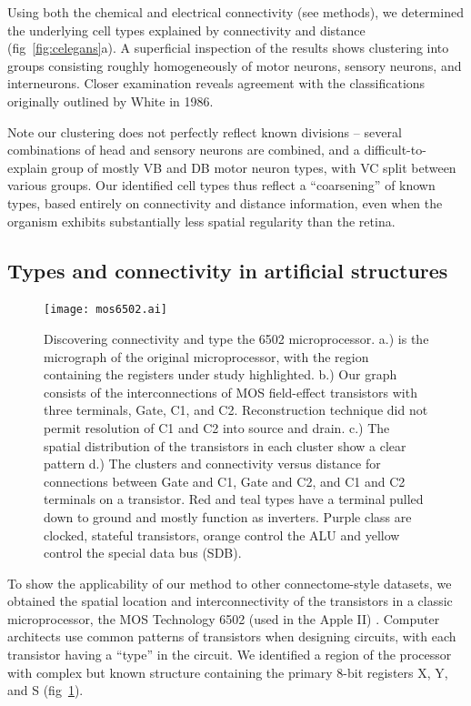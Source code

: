 \documentclass{article}
\begin{document}
Using both the chemical and electrical connectivity (see methods), we
determined the underlying cell types explained by connectivity and
distance (fig~\ref{fig:celegans}a). A superficial inspection of the
results shows clustering into groups consisting roughly homogeneously
of motor neurons, sensory neurons, and interneurons. Closer
examination reveals agreement with the classifications originally
outlined by White in 1986.


Note our clustering does not perfectly reflect known divisions --
several combinations of head and sensory neurons are combined, and a
difficult-to-explain group of mostly VB and DB motor neuron types,
with VC split between various groups. Our identified cell types thus
reflect a ``coarsening'' of known types, based entirely on
connectivity and distance information, even when the organism exhibits
substantially less spatial regularity than the retina.

\subsection*{Types and connectivity in artificial structures}
\begin{figure}
  \centering 
  \centerline{\texttt{[image: mos6502.ai]}}
  \caption{Discovering connectivity and type the 6502 microprocessor.
    a.) is the micrograph of the original microprocessor, with the
    region containing the registers under study highlighted. b.) Our
    graph consists of the interconnections of MOS field-effect
    transistors with three terminals, Gate, C1, and C2. Reconstruction
    technique did not permit resolution of C1 and C2 into source and
    drain. c.) The spatial distribution of the transistors in each
    cluster show a clear pattern d.) The clusters and connectivity
    versus distance for connections between Gate and C1, Gate and C2,
    and C1 and C2 terminals on a transistor. Red and teal types have a
    terminal pulled down to ground and mostly function as
    inverters. Purple class are clocked, stateful transistors, orange
    control the ALU and yellow control the special data bus (SDB).}
  \label{fig:mos6502}
\end{figure}


To show the applicability of our method to other connectome-style
datasets, we obtained the spatial location and interconnectivity of
the transistors in a classic microprocessor, the MOS Technology 6502
(used in the Apple II) \autocite{James2010}. Computer architects use
common patterns of transistors when designing circuits, with each
transistor having a ``type'' in the circuit. We identified a region of
the processor with complex but known structure containing the primary
8-bit registers X, Y, and S (fig~\ref{fig:mos6502}).
\end{document}
